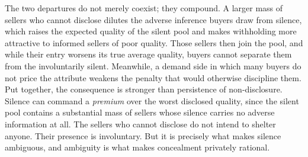 The two departures do not merely coexist; they compound. A larger mass of sellers who cannot
disclose dilutes the adverse inference buyers draw from silence, which raises the expected quality
of the silent pool and makes withholding more attractive to informed sellers of poor quality.
Those sellers then join the pool, and while their entry worsens its true average quality, buyers
cannot separate them from the involuntarily silent. Meanwhile, a demand side in which many buyers
do not price the attribute weakens the penalty that would otherwise discipline them. Put together,
the consequence is stronger than persistence of non-disclosure. Silence can command a
\emph{premium} over the worst disclosed quality, since the silent pool contains a substantial
mass of sellers whose silence carries no adverse information at all. The sellers who cannot
disclose do not intend to shelter anyone. Their presence is involuntary. But it is precisely what
makes silence ambiguous, and ambiguity is what makes concealment privately rational.
